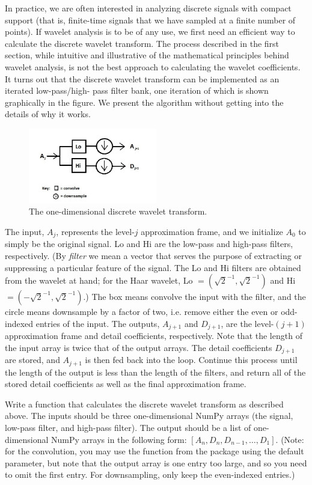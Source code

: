 In practice, we are often interested in analyzing discrete signals with compact support (that is,
finite-time signals that we have sampled at a finite number of points). If wavelet analysis is
to be of any use, we first need an efficient way to calculate the discrete wavelet transform.
The process described in the first section, while intuitive and illustrative of the mathematical
principles
behind wavelet analysis, is not the best approach to calculating the wavelet coefficients. It
turns out that the discrete wavelet transform can be implemented as an iterated low-pass/high-
pass filter bank, one iteration of which is shown graphically in the figure. We present the
algorithm without getting into the details of why it works.
\begin{figure}[H]
\centering
\includegraphics[width = 0.5\textwidth]{dwt1}
\caption{The one-dimensional discrete wavelet transform.}
\end{figure}
The input, $A_j$, represents the level-$j$ approximation frame, and we initialize $A_0$ to
simply be the original signal. Lo and Hi are the low-pass and high-pass filters, respectively.
(By \emph{filter} we mean a vector that serves the purpose of extracting or suppressing a
particular feature of the signal. The Lo and Hi filters are obtained from the wavelet at hand;
for the Haar wavelet, Lo $= (\sqrt{2}^{-1}, \sqrt{2}^{-1})$ and Hi $= (-\sqrt{2}^{-1}, \sqrt{2}
^{-1})$.) The box means convolve the input with the filter, and the circle means downsample by
a factor of two, i.e. remove either the even or odd-indexed entries of the input. The outputs,
$A_{j+1}$ and $D_{j+1}$, are the level-$(j+1)$ approximation frame and detail coefficients,
respectively. Note that the length of the input array is twice that of the output arrays. The
detail coefficients $D_{j+1}$ are stored, and $A_{j+1}$ is then fed back into the loop. Continue
this process until the length of the output is less than the length of the filters, and
return all of the stored detail coefficients as well as the final approximation frame.
\begin{problem}
Write a function that calculates the discrete wavelet transform as described above.
The inputs should be three one-dimensional NumPy arrays (the signal, low-pass filter, and
high-pass filter). The output should be a list of one-dimensional NumPy arrays in the
following form: $[A_n, D_n, D_{n-1},\ldots,D_1]$. (Note: for the convolution, you may use
the  function from the  package using the default
 parameter, but note that the output array is one entry too large, and so
you need to omit the first entry. For downsampling, only keep the even-indexed entries.)
\end{problem}

